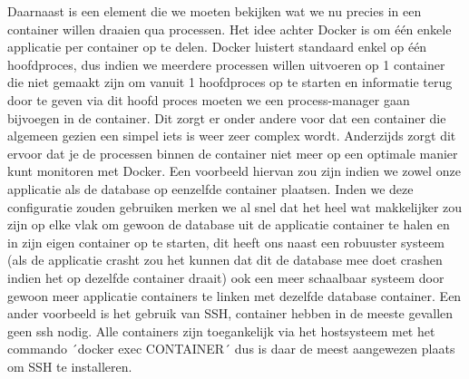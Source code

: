 Daarnaast is een element die we moeten bekijken wat we nu precies in een container willen draaien qua processen. Het idee achter Docker is om één enkele applicatie per container op te delen. Docker luistert standaard enkel op één hoofdproces, dus indien we meerdere processen willen uitvoeren op 1 container die niet gemaakt zijn om vanuit 1 hoofdproces op te starten en informatie terug door te geven via dit hoofd proces moeten we een process-manager gaan bijvoegen in de container. Dit zorgt er onder andere voor dat een container die algemeen gezien een simpel iets is weer zeer complex wordt. Anderzijds zorgt dit ervoor dat je de processen binnen de container niet meer op een optimale manier kunt monitoren met Docker. Een voorbeeld hiervan zou zijn indien we zowel onze applicatie als de database op eenzelfde container plaatsen. Inden we deze configuratie zouden gebruiken merken we al snel dat het heel wat makkelijker zou zijn op elke vlak om gewoon de database uit de applicatie container te halen en in zijn eigen container op te starten, dit heeft ons naast een robuuster systeem (als de applicatie crasht zou het kunnen dat dit de database mee doet crashen indien het op dezelfde container draait) ook een meer schaalbaar systeem door gewoon meer applicatie containers te linken met dezelfde database container. Een ander voorbeeld is het gebruik van SSH, container hebben in de meeste gevallen geen ssh nodig. Alle containers zijn toegankelijk via het hostsysteem met het commando ´docker exec CONTAINER´ dus is daar de meest aangewezen plaats om SSH te installeren.

